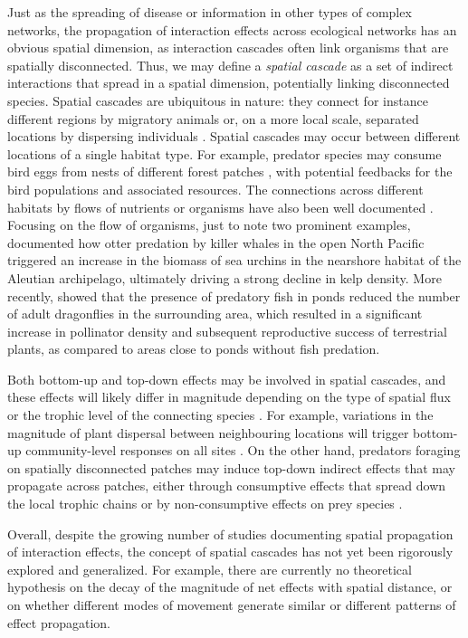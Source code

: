 Just as the spreading of disease \citep{Balcan2009} or information \citep{Barthelemy2011} in other types of complex networks, the propagation of interaction effects across ecological networks has an obvious spatial dimension, as interaction cascades often link organisms that are spatially disconnected. Thus, we may define a \textit{spatial cascade} as a set of indirect interactions that spread in a spatial dimension, potentially linking disconnected species. Spatial cascades are ubiquitous in nature: they connect for instance different regions by migratory animals \citep{Springer2018} or, on a more local scale, separated locations by dispersing individuals \citep{Leibold2004}. Spatial cascades may occur between different locations of a single habitat type. For example, predator species may consume bird eggs from nests of different forest patches \citep{Chalfoun2002}, with potential feedbacks for the bird populations and associated resources. The connections across different habitats by flows of nutrients or organisms have also been well documented \citep{Polis1997}. Focusing on the flow of organisms, just to note two prominent examples, \cite{Estes1998} documented how otter predation by killer whales in the open North Pacific triggered an increase in the biomass of sea urchins in the nearshore habitat of the Aleutian archipelago, ultimately driving a strong decline in kelp density. More recently, \cite{Knight2005} showed that the presence of predatory fish in ponds reduced the number of adult dragonflies in the surrounding area, which resulted in a significant increase in pollinator density and subsequent reproductive success of terrestrial plants, as compared to areas close to ponds without fish predation.

Both bottom-up and top-down effects may be involved in spatial cascades, and these effects will likely differ in magnitude depending on the type of spatial flux or the trophic level of the connecting species \citep{Allen2016}. For example, variations in the magnitude of plant dispersal between neighbouring locations will trigger bottom-up community-level responses on all sites \citep{Christian2001}. On the other hand, predators foraging on spatially disconnected patches may induce top-down indirect effects that may propagate across patches, either through consumptive effects that spread down the local trophic chains \citep{Polis1997} or by non-consumptive effects on prey species \citep{Orrock2008}.

Overall, despite the growing number of studies documenting spatial propagation of interaction effects, the concept of spatial cascades has not yet been rigorously explored and generalized. For example, there are currently no theoretical hypothesis on the decay of the magnitude of net effects with spatial distance, or on whether different modes of movement generate similar or different patterns of effect propagation.

